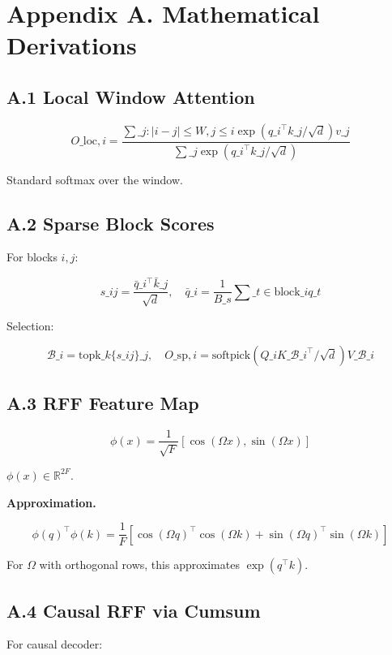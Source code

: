 
\section{Appendix A. Mathematical Derivations}

\subsection{A.1 Local Window Attention}

\[
O\_{\text{loc}, i} = \frac{\sum\_{j: |i - j| \leq W, j \leq i} \exp(q\_i^\top k\_j / \sqrt{d}) v\_j}{\sum\_{j} \exp(q\_i^\top k\_j / \sqrt{d})}
\tag{A.1}
\]

Standard softmax over the window.

\subsection{A.2 Sparse Block Scores}

For blocks $i, j$:

\[
s\_{ij} = \frac{\bar{q}\_i^\top \bar{k}\_j}{\sqrt{d}}, \quad
\bar{q}\_i = \frac{1}{B\_s} \sum\_{t \in \text{block}\_i} q\_t
\tag{A.2}
\]

Selection:

\[
\mathcal{B}\_i = \text{topk}\_{k}\{s\_{ij}\}\_j, \quad
O\_{\text{sp}, i} = \text{softpick}(Q\_i K\_{\mathcal{B}\_i}^\top / \sqrt{d}) V\_{\mathcal{B}\_i}
\tag{A.3}
\]

\subsection{A.3 RFF Feature Map}

\[
\phi(x) = \frac{1}{\sqrt{F}} [\cos(\Omega x), \sin(\Omega x)]
\tag{A.4}
\]

$\phi(x) \in \mathbb{R}^{2F}$.

\textbf{Approximation.}

\[
\phi(q)^\top \phi(k) = \frac{1}{F} [\cos(\Omega q)^\top \cos(\Omega k) + \sin(\Omega q)^\top \sin(\Omega k)]
\tag{A.5}
\]

For $\Omega$ with orthogonal rows, this approximates $\exp(q^\top k)$.

\subsection{A.4 Causal RFF via Cumsum}

For causal decoder:

